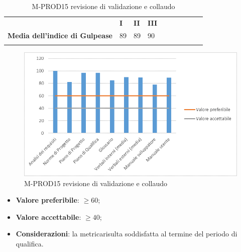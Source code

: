 \pagebreak
\begin{longtable} {						
		>{}p{70mm}  		
		>{}p{8mm}		
		>{}p{8mm}		
		>{}p{8mm}		
		>{}p{8mm}		
		>{}p{8mm}		
		>{}p{8mm}
		>{}p{8mm}
		>{}p{8mm}
		>{}p{8mm}				
	}			
	\rowcolor{gray!50}
	\textbf{} & \textbf{I} & \textbf{II} & \textbf{III} \TBstrut \\ [2mm]
	\textbf{Media dell'indice di Gulpease} & 89 & 89 & 90 \TBstrut \\ [2mm]
	\rowcolor{white}
	\caption{M-PROD15 revisione di validazione e collaudo}
\end{longtable}
\begin{figure}[H] 	
	\includegraphics[width=\linewidth]{./img/grafici/RA15b.png}	
	\caption{M-PROD15 revisione di validazione e collaudo}	
\end{figure}
\begin{itemize}
	\item \textbf{Valore preferibile}: $\ge60$;
	\item \textbf{Valore accettabile}: $\ge40$;
	\item \textbf{Considerazioni}: la metrica\glosp risulta soddisfatta al termine del periodo di qualifica.
\end{itemize}

